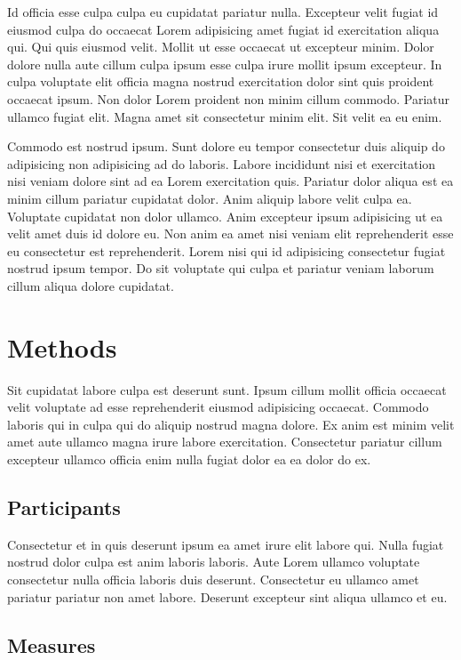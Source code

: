 \documentclass[
  super,
  preprint,
  3p]{elsarticle}
\begin{document}
Id officia esse culpa culpa eu cupidatat pariatur nulla. Excepteur velit
fugiat id eiusmod culpa do occaecat Lorem adipisicing amet fugiat id
exercitation aliqua qui. Qui quis eiusmod velit. Mollit ut esse occaecat
ut excepteur minim. Dolor dolore nulla aute cillum culpa ipsum esse
culpa irure mollit ipsum excepteur. In culpa voluptate elit officia
magna nostrud exercitation dolor sint quis proident occaecat ipsum. Non
dolor Lorem proident non minim cillum commodo. Pariatur ullamco fugiat
elit. Magna amet sit consectetur minim elit. Sit velit ea eu enim.

Commodo est nostrud ipsum. Sunt dolore eu tempor consectetur duis
aliquip do adipisicing non adipisicing ad do laboris. Labore incididunt
nisi et exercitation nisi veniam dolore sint ad ea Lorem exercitation
quis. Pariatur dolor aliqua est ea minim cillum pariatur cupidatat
dolor. Anim aliquip labore velit culpa ea. Voluptate cupidatat non dolor
ullamco. Anim excepteur ipsum adipisicing ut ea velit amet duis id
dolore eu. Non anim ea amet nisi veniam elit reprehenderit esse eu
consectetur est reprehenderit. Lorem nisi qui id adipisicing consectetur
fugiat nostrud ipsum tempor. Do sit voluptate qui culpa et pariatur
veniam laborum cillum aliqua dolore cupidatat.

\hypertarget{methods-1}{%
\section{Methods}\label{methods-1}}

Sit cupidatat labore culpa est deserunt sunt. Ipsum cillum mollit
officia occaecat velit voluptate ad esse reprehenderit eiusmod
adipisicing occaecat. Commodo laboris qui in culpa qui do aliquip
nostrud magna dolore. Ex anim est minim velit amet aute ullamco magna
irure labore exercitation. Consectetur pariatur cillum excepteur ullamco
officia enim nulla fugiat dolor ea ea dolor do ex.

\subsection{Participants}

Consectetur et in quis deserunt ipsum ea amet irure elit labore qui.
Nulla fugiat nostrud dolor culpa est anim laboris laboris. Aute Lorem
ullamco voluptate consectetur nulla officia laboris duis deserunt.
Consectetur eu ullamco amet pariatur pariatur non amet labore. Deserunt
excepteur sint aliqua ullamco et eu.

\subsection{Measures}
\end{document}
